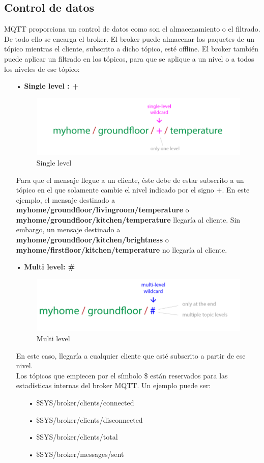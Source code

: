 \documentclass[12pt, twoside]{book}
\begin{document}
\subsection{Control de datos}
MQTT proporciona un control de datos como son el almacenamiento o el filtrado. De todo ello se encarga el broker. El broker puede almacenar los paquetes de un tópico mientras el cliente, subscrito a dicho tópico, esté offline. El broker también puede aplicar un filtrado en los tópicos, para que se aplique a un nivel o a todos los niveles de ese tópico:
\begin{itemize}
\item[•]\textbf{Single level : +} \\
\begin{figure}[h!]
\centering
\includegraphics[scale=0.5]{images/figure4}
\caption{Single level}\label{L409}
\end{figure}
Para que el mensaje llegue a un cliente, éste debe de estar subscrito a un tópico en el que solamente cambie el nivel indicado por el signo +. En este ejemplo, el mensaje destinado a \textbf{myhome/groundfloor/livingroom/temperature} o \textbf{myhome/groundfloor/kitchen/temperature} llegaría al cliente. Sin embargo, un mensaje destinado a \textbf{myhome/groundfloor/kitchen/brightness} o \textbf{myhome/firstfloor/kitchen/temperature} no llegaría al cliente.
\item[•]\textbf{Multi level: \#}\\
\begin{figure}[h!]
\centering
\includegraphics[scale=0.5]{images/figure5}
\caption{Multi level}\label{L410}
\end{figure}
En este caso, llegaría a cualquier cliente que esté subscrito a partir de ese nivel.\\
Los tópicos que empiecen por el símbolo \$ están reservados para las estadísticas internas del broker MQTT. Un ejemplo puede ser:
\begin{itemize}
\item[•]\$SYS/broker/clients/connected
\item[•]\$SYS/broker/clients/disconnected
\item[•]\$SYS/broker/clients/total
\item[•]\$SYS/broker/messages/sent
\end{itemize}
\end{itemize}
\end{document}
